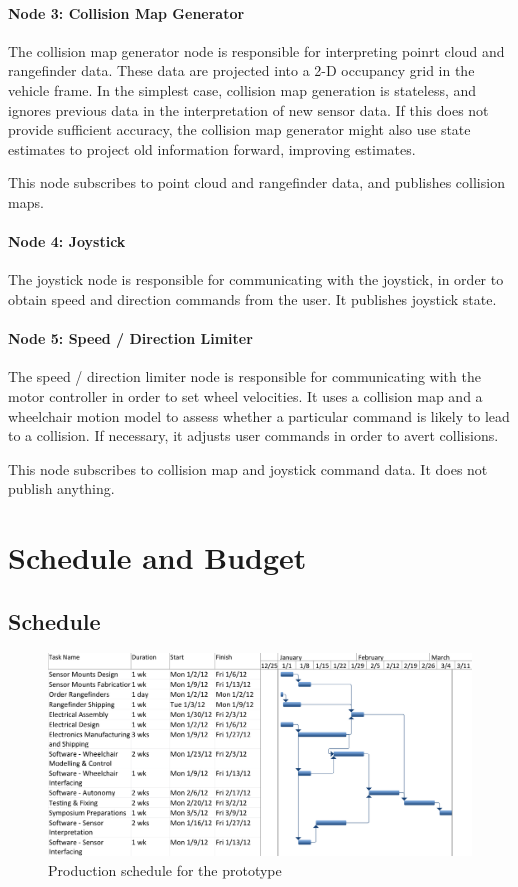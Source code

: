 \documentclass[oneside,final,a4paper]{report}
\begin{document}
\subsubsection{Node 3: Collision Map Generator}
The collision map generator node is responsible for interpreting poinrt cloud and rangefinder data.  These data are projected into a 2-D occupancy grid in the vehicle frame.  In the simplest case, collision map generation is stateless, and ignores previous data in the interpretation of new sensor data.  If this does not provide sufficient accuracy, the collision map generator might also use state estimates to project old information forward, improving estimates.  

This node subscribes to point cloud and rangefinder data, and publishes collision maps.

\subsubsection{Node 4: Joystick}
The joystick node is responsible for communicating with the joystick, in order to obtain speed and direction commands from the user.  It publishes joystick state.

\subsubsection{Node 5: Speed / Direction Limiter}
The speed / direction limiter node is responsible for communicating with the motor controller in order to set wheel velocities.  It uses a collision map and a wheelchair motion model to assess whether a particular command is likely to lead to a collision.  If necessary, it adjusts user commands in order to avert collisions.

This node subscribes to collision map and joystick command data.  It does not publish anything.

\chapter{Schedule and Budget}

\section{Schedule}
\begin{figure}[htb]
 \centering
 \includegraphics[scale=0.6]{gantt.png}
 \caption{Production schedule for the prototype}
 \label{schedule}
\end{figure}
\end{document}
